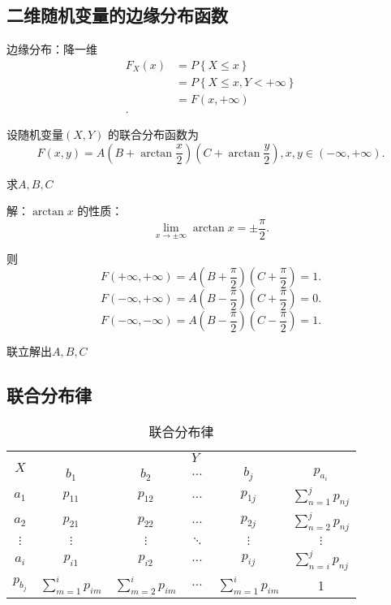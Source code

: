 \subsection{二维随机变量的边缘分布函数}%
\label{sub:二维随机变量的边缘分布函数}
边缘分布：降一维
\begin{align*}
    F_{X}\left( x \right) &= P\left\{ X\le x \right\}  \\
    &= P\left\{ X\le x,Y<+\infty \right\}  \\
    &= F\left( x,+\infty \right)  \\
.\end{align*}
\begin{eg}
    设随机变量$\left( X,Y \right) $ 的联合分布函数为\[
        F\left( x,y \right) =A\left( B+\arctan \frac{x}{2} \right) \left( C+\arctan \frac{y}{2} \right) , x,y\in \left( -\infty,+\infty \right) 
    .\] 

    求$A,B,C$ 

    解：$\arctan x$ 的性质：\[
        \lim_{x \to \pm\infty} \arctan x=\pm\frac{\pi}{2}
    .\] 

    则\[
        F\left( +\infty,+\infty \right) =A\left( B+\frac{\pi}{2} \right) \left( C+\frac{\pi}{2} \right)=1 
    .\] 
    \[
        F\left( -\infty,+\infty \right) =A\left( B-\frac{\pi}{2} \right) \left( C+\frac{\pi}{2} \right) =0
    .\] 
    \[
        F\left( -\infty,-\infty \right) =A\left( B-\frac{\pi}{2} \right) \left( C-\frac{\pi}{2} \right) =1
    .\] 

    联立解出$A,B,C$
\end{eg}
\subsection{联合分布律}%
\label{sub:联合分布律}
\begin{table}[htpb]
    \centering
    \caption{联合分布律}
    \label{tab:联合分布律}
    \begin{tabular}{ccccc|c}
    \toprule
    \multirow{2}{*}{$X$} & \multicolumn{5}{c}{$Y$} \\
    \cmidrule{2-6}
                         & $b_1$ & $b_2$ & $\ldots$ & $b_{j}$ & $p_{a_{i}}$ \\
                         \hline
    $a_1$ & $p_{11}$ & $p_{12}$ & $\ldots$ & $p_{1j}$ & $\displaystyle{\sum_{n=1}^{j} p_{nj}}$\\
    $a_2$ & $p_{21}$ & $p_{22}$ & $\ldots$ & $p_{2j}$ & $\displaystyle{\sum_{n=2}^{j} p_{nj}}$ \\
    $\vdots$ & $\vdots$ & $\vdots$ & $\ddots$ & $\vdots$ & $\vdots$\\
    $a_{i}$ & $p_{i1}$ & $p_{i2}$ & $\ldots$ & $p_{ij}$ & $\displaystyle{\sum_{n=i}^{j} p_{nj}}$\\
    \hline
    $p_{b_{j}}$ & $\displaystyle{\sum_{m=1}^{i} p_{im}}$ & $\displaystyle{\sum_{m=2}^{i} p_{im}}$ & $\ldots$ & $\displaystyle{\sum_{m=1}^{i} p_{im}}$ & 1\\
    \bottomrule
    \end{tabular}
\end{table}

